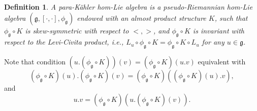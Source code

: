 \documentclass[10pt]{amsart}
\numberwithin{equation}{section}
\newtheorem{definition}[theorem]{Definition}
\begin{document}
\begin{definition}
A para-K\"{a}hler hom-Lie algebra is a pseudo-Riemannian hom-Lie algebra $(\mathfrak{g}, [\cdot, \cdot], \phi_{\mathfrak{g}})$ endowed with an almost product structure $K$, such that ${ \phi_\mathfrak{g}}\circ K$ is skew-symmetric with respect to $<,>$, and ${ \phi_\mathfrak{g}}\circ K$ is invariant with respect to the Levi-Civita product, i.e., $L_u\circ { \phi_\mathfrak{g}}\circ K={ \phi_\mathfrak{g}}\circ K\circ L_u$ for any $u\in \mathfrak{g}$.
\end{definition}
Note that condition $(u.({ \phi_\mathfrak{g}}\circ K))(v)=({ \phi_\mathfrak{g}}\circ K)(u.v)$ equivalent with 
\begin{equation}\label{AM1}
({ \phi_\mathfrak{g}}\circ K)(u).({ \phi_\mathfrak{g}}\circ K)(v)=({ \phi_\mathfrak{g}}\circ K)(({ \phi_\mathfrak{g}}\circ K)(u).v),
\end{equation}
and
\begin{equation}\label{AM2}
u.v=({ \phi_\mathfrak{g}}\circ K)(u.({ \phi_\mathfrak{g}}\circ K)(v)).
\end{equation}
\end{document}
